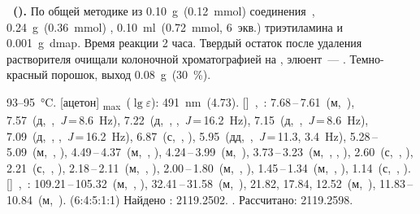 \textbf{~().} 
По общей методике из \SI{0.10}{\gram}~(\SI{0.12}{\milli\mole}) соединения~, \SI{0.24}{\gram}~(\SI{0.36}{\milli\mole}) , \SI{0.10}{\milli\litre}~(\SI{0.72}{\milli\mole}, 6~экв.) триэтиламина и \SI{0.001}{\gram}~\ac{dmap}.
Время реакции 2 часа. Твердый остаток после удаления растворителя очищали колоночной хроматографией на , элюент~--- .
Темно-красный порошок, выход \SI{0.08}{\gram}~(\SI{30}{\percent}).
\begin{experimental}
     93--\SI{95}{\celsius}.
    [ацетон] \chemlambda\textsubscript{max}~($\lg \varepsilon$): \SI{491}{\nano\metre}~(4.73).
    []~\chemdelta,~\si{\ppm}: 7.68\,--\,7.61~(м,~), 7.57~(д,~,~\textit{J}\,=\,8.6~\si{\hertz}), 7.22~(д,~, ,~\textit{J}\,=\,16.2~\si{\hertz}), 7.15~(д,~,~\textit{J}\,=\,8.6~\si{\hertz}), 7.09~(д,~, ,~\textit{J}\,=\,16.2~\si{\hertz}), 6.87~(с,~, ), 5.95~(дд,~,~\textit{J}\,=\,11.3, 3.4~\si{\hertz}), 5.28\,--\,5.09~(м,~, ), 4.49\,--\,4.37~(м,~, ), 4.24\,--\,3.99~(м,~), 3.73\,--\,3.23~(м,~, , ), 2.60~(с,~, ), 2.21~(с,~, ), 2.18\,--\,2.11~(м,~, ), 2.00\,--\,1.80~(м,~, ), 1.45\,--\,1.34~(м,~, ), 1.14~(с,~, ).
    []~\chemdelta,~\si{\ppm}: 109.21\,--\,105.32~(м,~, ), 32.41\,--\,31.58~(м,~), 21.82, 17.84, 12.52~(м,~), 11.83\,--\,10.84~(м,~). (6:4:5:1:1)
     Найдено \ce{[M - H]-}: \num{2119.2502}. . Рассчитано: \ce{[M - H]} \num{2119.2598}.
\end{experimental}

